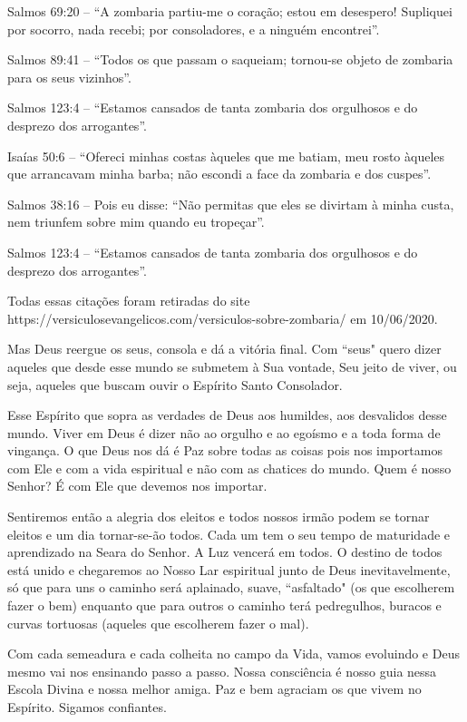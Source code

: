 \emdash{}Salmos 69:20 – ``A zombaria partiu-me o coração; estou em desespero! Supliquei por socorro, nada recebi; por consoladores, e a ninguém encontrei”.

\emdash{}Salmos 89:41 – ``Todos os que passam o saqueiam; tornou-se objeto de zombaria para os seus vizinhos”.

\emdash{}Salmos 123:4 – ``Estamos cansados de tanta zombaria dos orgulhosos e do desprezo dos arrogantes”.

\emdash{}Isaías 50:6 – ``Ofereci minhas costas àqueles que me batiam, meu rosto àqueles que arrancavam minha barba; não escondi a face da zombaria e dos cuspes”.

\emdash{}Salmos 38:16 – Pois eu disse: ``Não permitas que eles se divirtam à minha custa, nem triunfem sobre mim quando eu tropeçar”.

\emdash{}Salmos 123:4 – ``Estamos cansados de tanta zombaria dos orgulhosos e do desprezo dos arrogantes”.

\emdash{}Todas essas citações foram retiradas do site https://versiculosevangelicos.com/versiculos-sobre-zombaria/ em 10/06/2020.


\emdash{}Mas Deus reergue os seus, consola e dá a vitória final. Com ``seus" quero dizer aqueles que desde esse mundo se submetem à Sua vontade, Seu jeito de viver, ou seja, aqueles que buscam ouvir o Espírito Santo Consolador.

\emdash{}Esse Espírito que sopra as verdades de Deus aos humildes, aos desvalidos desse mundo. Viver em Deus é dizer não ao orgulho e ao egoísmo e a toda forma de vingança. O que Deus nos dá é Paz sobre todas as coisas pois nos importamos com Ele e com a vida espiritual e não com as chatices do mundo. Quem é nosso Senhor? É com Ele que devemos nos importar.

\emdash{}Sentiremos então a alegria dos eleitos e todos nossos irmão podem se tornar eleitos e um dia tornar-se-ão todos. Cada um tem o seu tempo de maturidade e aprendizado na Seara do Senhor. A Luz vencerá em todos. O destino de todos está unido e chegaremos ao Nosso Lar espiritual junto de Deus inevitavelmente, só que para uns o caminho será aplainado, suave, ``asfaltado" (os que escolherem fazer o bem) enquanto que para outros o caminho terá pedregulhos, buracos e curvas tortuosas (aqueles que escolherem fazer o mal).

\emdash{}Com cada semeadura e cada colheita no campo da Vida, vamos evoluindo e Deus mesmo vai nos ensinando passo a passo. Nossa consciência é nosso guia nessa Escola Divina e nossa melhor amiga. Paz e bem agraciam os que vivem no Espírito. Sigamos confiantes.